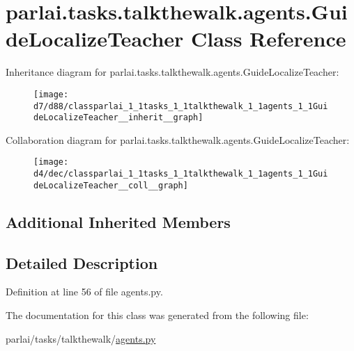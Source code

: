 \hypertarget{classparlai_1_1tasks_1_1talkthewalk_1_1agents_1_1GuideLocalizeTeacher}{}\section{parlai.\+tasks.\+talkthewalk.\+agents.\+Guide\+Localize\+Teacher Class Reference}
\label{classparlai_1_1tasks_1_1talkthewalk_1_1agents_1_1GuideLocalizeTeacher}


Inheritance diagram for parlai.\+tasks.\+talkthewalk.\+agents.\+Guide\+Localize\+Teacher\+:\nopagebreak
\begin{figure}[H]
\begin{center}
\leavevmode
\texttt{[image: d7/d88/classparlai\_1\_1tasks\_1\_1talkthewalk\_1\_1agents\_1\_1GuideLocalizeTeacher\_\_inherit\_\_graph]}
\end{center}
\end{figure}


Collaboration diagram for parlai.\+tasks.\+talkthewalk.\+agents.\+Guide\+Localize\+Teacher\+:\nopagebreak
\begin{figure}[H]
\begin{center}
\leavevmode
\texttt{[image: d4/dec/classparlai\_1\_1tasks\_1\_1talkthewalk\_1\_1agents\_1\_1GuideLocalizeTeacher\_\_coll\_\_graph]}
\end{center}
\end{figure}
\subsection*{Additional Inherited Members}


\subsection{Detailed Description}


Definition at line 56 of file agents.\+py.



The documentation for this class was generated from the following file\+:\begin{DoxyCompactItemize}
\item 
parlai/tasks/talkthewalk/\hyperlink{parlai_2tasks_2talkthewalk_2agents_8py}{agents.\+py}\end{DoxyCompactItemize}
